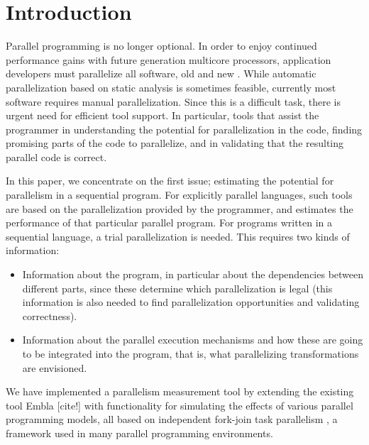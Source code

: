 \section{Introduction}

Parallel programming is no longer optional.  In order to enjoy continued
performance gains with future generation multicore processors,
application developers must parallelize all software, old and
new
.  
While automatic parallelization based on static analysis 
is sometimes feasible, currently most software requires manual
parallelization.
Since this is a difficult task, there is urgent need for efficient tool support. 
In particular, tools that assist the programmer in understanding the potential 
for parallelization in the code, finding promising parts of the code to parallelize, 
and in validating that the resulting parallel code is correct.

In this paper, we concentrate on the first issue; estimating the potential 
for parallelism in a sequential program. For explicitly parallel languages, 
such tools are based on the parallelization provided by the programmer, and 
estimates the performance of that particular parallel program. For programs written
in a sequential language,
a trial parallelization is needed. This requires two kinds of information:
\begin{itemize}
\item
Information about the program, in particular about the dependencies between 
different parts, since these determine which parallelization is legal (this 
information is also needed to find parallelization opportunities and validating 
correctness).
\item
Information about the parallel execution mechanisms and how these are going
to be integrated into the program, that is, what parallelizing transformations 
are envisioned.
\end{itemize}
We have implemented a parallelism measurement tool by extending the existing
tool Embla [cite!] with functionality for simulating the effects of various parallel 
programming models, all based on independent fork-join task parallelism
, a framework used in many parallel programming environments.


